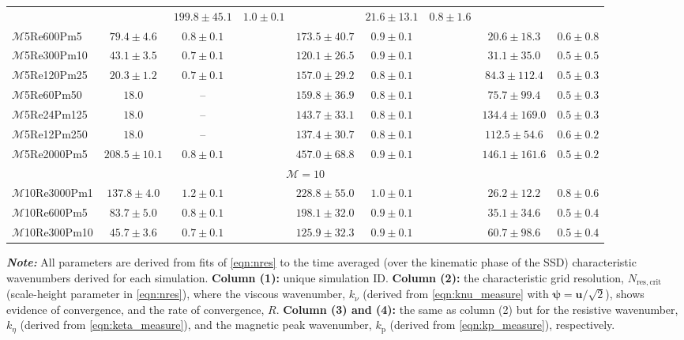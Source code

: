 \documentclass[12pt,twoside]{extreport}
\newcommand{\mVector}[1]{\bm{#1}} %
\newcommand{\mSonicMach}{\ensuremath{\mathcal{M}}} %
\begin{document}
\begin{table}
{{\begin{threeparttable}
\begin{tabular}{l cc l cc l cc}
	&& $199.8 \pm 45.1$ & $1.0 \pm 0.1$
	&& $21.6 \pm 13.1$ & $0.8 \pm 1.6$ \\
$\mSonicMach$5Re600Pm5
	& $79.4 \pm 4.6$ & $0.8 \pm 0.1$
	&& $173.5 \pm 40.7$ & $0.9 \pm 0.1$
	&& $20.6 \pm 18.3$ & $0.6 \pm 0.8$ \\
$\mSonicMach$5Re300Pm10
	& $43.1 \pm 3.5$ & $0.7 \pm 0.1$
	&& $120.1 \pm 26.5$ & $0.9 \pm 0.1$
	&& $31.1 \pm 35.0$ & $0.5 \pm 0.5$ \\
$\mSonicMach$5Re120Pm25
	& $20.3 \pm 1.2$ & $0.7 \pm 0.1$
	&& $157.0 \pm 29.2$ & $0.8 \pm 0.1$
	&& $84.3 \pm 112.4$ & $0.5 \pm 0.3$ \\
$\mSonicMach$5Re60Pm50
	& $18.0$ & --
	&& $159.8 \pm 36.9$ & $0.8 \pm 0.1$
	&& $75.7 \pm 99.4$ & $0.5 \pm 0.3$ \\
$\mSonicMach$5Re24Pm125
	& $18.0$ & --
	&& $143.7 \pm 33.1$ & $0.8 \pm 0.1$
	&& $134.4 \pm 169.0$ & $0.5 \pm 0.3$ \\
$\mSonicMach$5Re12Pm250
	& $18.0$ & --
	&& $137.4 \pm 30.7$ & $0.8 \pm 0.1$
	&& $112.5 \pm 54.6$ & $0.6 \pm 0.2$ \\
$\mSonicMach$5Re2000Pm5
	& $208.5 \pm 10.1$ & $0.8 \pm 0.1$
	&& $457.0 \pm 68.8$ & $0.9 \pm 0.1$
	&& $146.1 \pm 161.6$ & $0.5 \pm 0.2$ \\
\hline
\multicolumn{9}{c}{$\mSonicMach = 10$} \\
\hline
$\mSonicMach$10Re3000Pm1
	& $137.8 \pm 4.0$ & $1.2 \pm 0.1$
	&& $228.8 \pm 55.0$ & $1.0 \pm 0.1$
	&& $26.2 \pm 12.2$ & $0.8 \pm 0.6$ \\
$\mSonicMach$10Re600Pm5
	& $83.7 \pm 5.0$ & $0.8 \pm 0.1$
	&& $198.1 \pm 32.0$ & $0.9 \pm 0.1$
	&& $35.1 \pm 34.6$ & $0.5 \pm 0.4$ \\
$\mSonicMach$10Re300Pm10
	& $45.7 \pm 3.6$ & $0.7 \pm 0.1$
	&& $125.9 \pm 32.3$ & $0.9 \pm 0.1$
	&& $60.7 \pm 98.6$ & $0.5 \pm 0.4$ \\
\hline
\hline
\end{tabular}

\begin{tablenotes}
    \textit{\textbf{Note:}} All parameters are derived from fits of \autoref{eqn:nres} to the time averaged (over the kinematic phase of the SSD) characteristic wavenumbers derived for each simulation. \textbf{Column (1):} unique simulation ID. \textbf{Column (2):} the characteristic grid resolution, $N_{\mathrm{res}, \mathrm{crit}}$ (scale-height parameter in \autoref{eqn:nres}), where the viscous wavenumber, $k_{\nu}$ (derived from \autoref{eqn:knu_measure} with $\mVector{\psi} = \mVector{u} / \sqrt{2}$), shows evidence of convergence, and the rate of convergence, $R$. \textbf{Column (3) and (4):} the same as column (2) but for the resistive wavenumber, $k_\eta$ (derived from \autoref{eqn:keta_measure}), and the magnetic peak wavenumber, $k_\mathrm{p}$ (derived from \autoref{eqn:kp_measure}), respectively.
\end{tablenotes}
\end{threeparttable}%
}%
}
\end{table}
\end{document}
